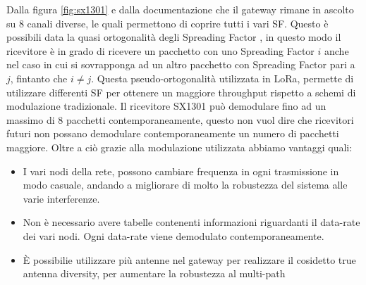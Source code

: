 Dalla figura \ref{fig:sx1301} e dalla documentazione 
che il gateway rimane in ascolto su 8 
canali diverse, le quali permettono di coprire tutti i vari SF. 
Questo è possibili data la quasi ortogonalità degli Spreading Factor
, in questo modo il ricevitore è in grado di ricevere un pacchetto
con uno Spreading Factor $i$ anche nel caso in cui si sovrapponga ad un altro
pacchetto con Spreading Factor pari a $j$, fintanto che $i\neq j$. Questa
pseudo-ortogonalità utilizzata in LoRa, permette di utilizzare differenti SF per
ottenere un maggiore throughput rispetto a schemi di modulazione tradizionale.
Il ricevitore  SX1301 può demodulare fino ad un massimo di 8 pacchetti
contemporaneamente, questo non vuol dire che ricevitori futuri non possano
demodulare contemporaneamente un numero di pacchetti maggiore.
Oltre a ciò grazie alla modulazione utilizzata abbiamo vantaggi quali:
\begin{itemize}
\item I vari nodi della rete, possono cambiare frequenza in ogni trasmissione in
modo casuale, andando a migliorare di molto la robustezza del sistema alle varie
interferenze.
\item Non è necessario avere tabelle contenenti informazioni riguardanti il
data-rate dei vari nodi. Ogni data-rate viene demodulato contemporaneamente.
\item È possibilie utilizzare più antenne nel gateway per realizzare il
cosidetto true antenna diversity, per aumentare la robustezza al multi-path
\end{itemize}

